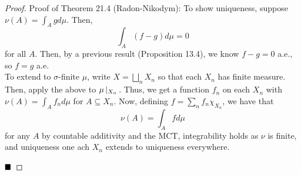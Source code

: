 \begin{proof}{Proof of Theorem 21.4 (Radon-Nikodym):}
    To show uniqueness, suppose $\nu(A) = \int_{A} g d\mu$. Then,
    \[ \int_{A} (f - g) d\mu = 0 \]
    for all $A$. Then, by a previous result (Proposition 13.4), we know $f - g = 0$ a.e., so $f = g$ a.e.\\

    To extend to $\sigma$-finite $\mu$, write $X = \bigsqcup_{n} X_n$ so that each $X_n$ has finite measure. Then, apply the above to $\mu\left|_{X_n}\right.$. Thus, we get a function $f_n$ on each $X_n$ with $\nu(A) = \int_{A} f_n d\mu$ for $A \subseteq X_n$. Now, defining $f = \sum_{n} f_n \chi_{X_n}$, we have that 
    \[ \nu(A) = \int_{A} f d\mu \]
    for any $A$ by countable additivity and the MCT, integrability holds as $\nu$ is finite, and uniqueness one ach $X_n$ extends to uniqueness everywhere. 

    $\qed$
\end{proof}
